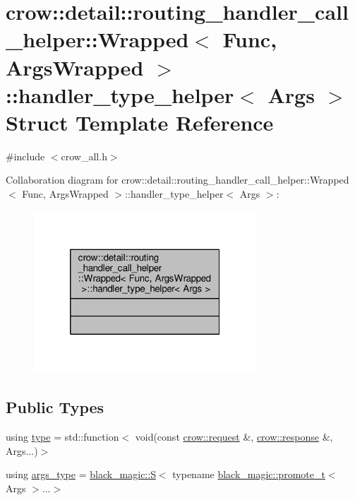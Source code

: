 \hypertarget{structcrow_1_1detail_1_1routing__handler__call__helper_1_1_wrapped_1_1handler__type__helper}{\section{crow\-:\-:detail\-:\-:routing\-\_\-handler\-\_\-call\-\_\-helper\-:\-:Wrapped$<$ Func, Args\-Wrapped $>$\-:\-:handler\-\_\-type\-\_\-helper$<$ Args $>$ Struct Template Reference}
\label{structcrow_1_1detail_1_1routing__handler__call__helper_1_1_wrapped_1_1handler__type__helper}
}


{\ttfamily \#include $<$crow\-\_\-all.\-h$>$}



Collaboration diagram for crow\-:\-:detail\-:\-:routing\-\_\-handler\-\_\-call\-\_\-helper\-:\-:Wrapped$<$ Func, Args\-Wrapped $>$\-:\-:handler\-\_\-type\-\_\-helper$<$ Args $>$\-:
\nopagebreak
\begin{figure}[H]
\begin{center}
\leavevmode
\includegraphics[width=236pt]{structcrow_1_1detail_1_1routing__handler__call__helper_1_1_wrapped_1_1handler__type__helper__coll__graph}
\end{center}
\end{figure}
\subsection*{Public Types}
\begin{DoxyCompactItemize}
\item 
using \hyperlink{structcrow_1_1detail_1_1routing__handler__call__helper_1_1_wrapped_1_1handler__type__helper_a4c2a9a1065506309bd9b8a37d6518e3e}{type} = std\-::function$<$ void(const \hyperlink{structcrow_1_1request}{crow\-::request} \&, \hyperlink{structcrow_1_1response}{crow\-::response} \&, Args...)$>$
\item 
using \hyperlink{structcrow_1_1detail_1_1routing__handler__call__helper_1_1_wrapped_1_1handler__type__helper_a9914a4b757ed58f4a938a45b26774055}{args\-\_\-type} = \hyperlink{structcrow_1_1black__magic_1_1_s}{black\-\_\-magic\-::\-S}$<$ typename \hyperlink{namespacecrow_1_1black__magic_a4964540ce915507f5167e1a96f801c71}{black\-\_\-magic\-::promote\-\_\-t}$<$ Args $>$...$>$
\end{DoxyCompactItemize}


